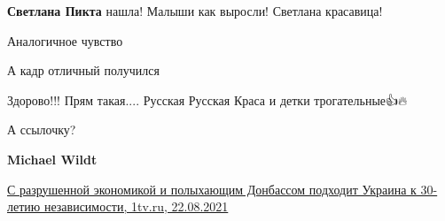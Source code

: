 \begin{itemize}
\begin{itemize}
 
\textbf{Светлана Пикта} нашла! Малыши как выросли! Светлана красавица!
\end{itemize}

 
Аналогичное чувство

 
А кадр отличный получился

 
Здорово!!!
Прям такая.... Русская Русская Краса и детки трогательные👍🔥

 
А ссылочку?

\begin{itemize}
 
\textbf{Michael Wildt} 

\href{https://www.1tv.ru/n/411804}{%
С разрушенной экономикой и полыхающим Донбассом подходит Украина к 30-летию независимости, 1tv.ru, 22.08.2021%
}

 

\end{itemize}
\end{itemize}
